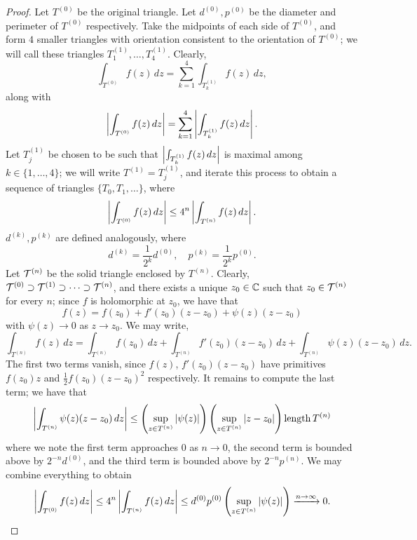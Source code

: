 \begin{proof}
    Let $T^{(0)}$ be the original triangle. Let $d^{(0)}, p^{(0)}$ be the diameter and perimeter of $T^{(0)}$ respectively. Take the midpoints of each side of $T^{(0)}$, and form $4$ smaller triangles with orientation consistent to the orientation of $T^{(0)}$; we will call these triangles $T_1^{(1)}, \dots, T_4^{(1)}$. Clearly,
    \[ \int_{T^{(0)}} f(z) \, dz = \sum_{k=1}^4 \int_{T_k^{(1)}} f(z) \, dz, \]
    along with
    \[ \left\lvert \int_{T^{(0)}} f(z) \, dz \right\rvert = \sum_{k=1}^4 \left\lvert \int_{T_k^{(1)}} f(z) \, dz \right\rvert. \]
    Let $T_j^{(1)}$ be chosen to be such that $\left\lvert \int_{T_k^{(1)}} f(z) \, dz \right\rvert$ is maximal among $k \in \{1, \dots, 4\}$; we will write $T^{(1)} = T_j^{(1)}$, and iterate this process to obtain a sequence of triangles $\{T_0, T_1, \dots\}$, where
    \[ \left\lvert \int_{T^{(0)}} f(z) \, dz \right\rvert \leq 4^n \left\lvert \int_{T^{(n)}} f(z) \, dz \right\rvert. \]
    $d^{(k)}, p^{(k)}$ are defined analogously, where
    \[ d^{(k)} = \frac{1}{2^k} d^{(0)}, \quad p^{(k)} = \frac{1}{2^k} p^{(0)}. \]
    Let $\mathcal T^{(n)}$ be the solid triangle enclosed by $T^{(n)}$. Clearly, $\mathcal T^{(0)} \supset \mathcal T^{(1)} \supset \dots \supset \mathcal T^{(n)}$, and there exists a unique $z_0 \in \mathbb C$ such that $z_0 \in \mathcal T^{(n)}$ for every $n$; since $f$ is holomorphic at $z_0$, we have that
    \[ f(z) = f(z_0) + f'(z_0)(z - z_0) + \psi(z)(z - z_0) \]
    with $\psi(z) \to 0$ as $z \to z_0$. We may write,
    \[ \int_{T^{(n)}} f(z) \, dz = \int_{T^{(n)}} f(z_0) \, dz + \int_{T^{(n)}} f'(z_0) (z - z_0) \, dz + \int_{T^{(n)}} \psi(z) (z - z_0) \, dz. \]
    The first two terms vanish, since $f(z)$, $f'(z_0)(z - z_0)$ have primitives $f(z_0) z$ and $\frac{1}{2} f(z_0) (z - z_0)^2$ respectively. It remains to compute the last term; we have that
    \[ \left\lvert \int_{T^{(n)}} \psi(z) (z - z_0) \, dz \right\rvert \leq \left(\sup_{z \in T^{(n)}} \left\lvert \psi(z) \right\rvert\right) \left(\sup_{z \in T^{(n)}} \left\lvert z - z_0 \right\rvert\right) \operatorname{length} T^{(n)} \]
    where we note the first term approaches $0$ as $n \to 0$, the second term is bounded above by $2^{-n} d^{(0)}$, and the third term is bounded above by $2^{-n} p^{(n)}$. We may combine everything to obtain
    \[ \left\lvert \int_{T^{(0)}} f(z) \, dz \right\rvert \leq 4^n \left\lvert \int_{T^{(n)}} f(z) \, dz \right\rvert \leq d^{(0)} p^{(0)} \left(\sup_{z \in T^{(n)}} \left\lvert \psi(z) \right\rvert\right) \xrightarrow{n \to \infty} 0. \qedhere \]
\end{proof}